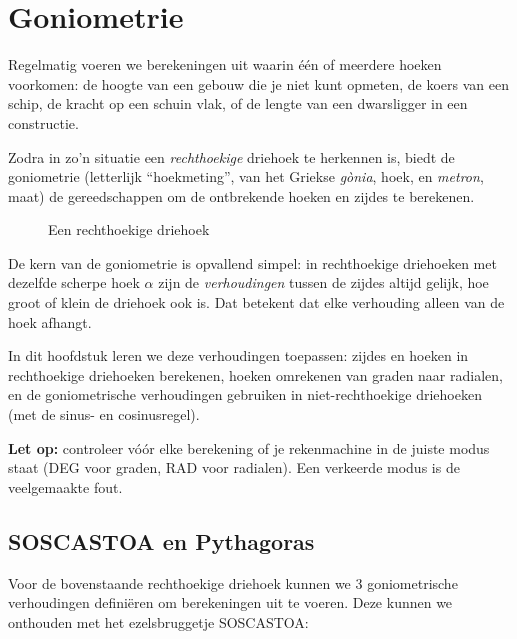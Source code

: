 \chapter{Goniometrie}
\label{chap:goniometrie}

Regelmatig voeren we berekeningen uit waarin \'e\'en of meerdere hoeken 
voorkomen: de hoogte van een gebouw die je niet kunt opmeten, de 
koers van een schip, de kracht op een schuin vlak, of de lengte van een 
dwarsligger in een constructie. 

Zodra in zo'n situatie een \emph{rechthoekige} driehoek te herkennen is, biedt de goniometrie (letterlijk ``hoekmeting'', van het Griekse \textit{g\`onia}, hoek, en \textit{metron}, maat) de gereedschappen om de ontbrekende hoeken en zijdes te berekenen.

    \begin{figure}[H]
        \centering
        \caption{Een rechthoekige driehoek}
        \label{fig:rechthoekigedriehoek}
    \end{figure}

De kern van de goniometrie is opvallend simpel: in rechthoekige 
driehoeken met dezelfde scherpe hoek $\alpha$ zijn de 
\emph{verhoudingen} tussen de zijdes altijd gelijk, hoe groot of klein 
de driehoek ook is. Dat betekent dat elke verhouding alleen van de 
hoek afhangt. 

In dit hoofdstuk leren we deze verhoudingen toepassen: zijdes en 
hoeken in rechthoekige driehoeken berekenen, hoeken omrekenen van 
graden naar radialen, en de goniometrische verhoudingen gebruiken in 
niet-rechthoekige driehoeken (met de sinus- en cosinusregel).

\textbf{Let op:} controleer v\'o\'or elke berekening of je rekenmachine 
in de juiste modus staat (DEG voor graden, RAD voor radialen). Een 
verkeerde modus is de veelgemaakte fout.



\vspace{-0.5cm}
\section{SOSCASTOA en Pythagoras}
Voor de bovenstaande rechthoekige driehoek kunnen we 3 goniometrische verhoudingen defini\"eren om berekeningen uit te voeren. Deze kunnen we onthouden met het ezelsbruggetje SOSCASTOA: 

